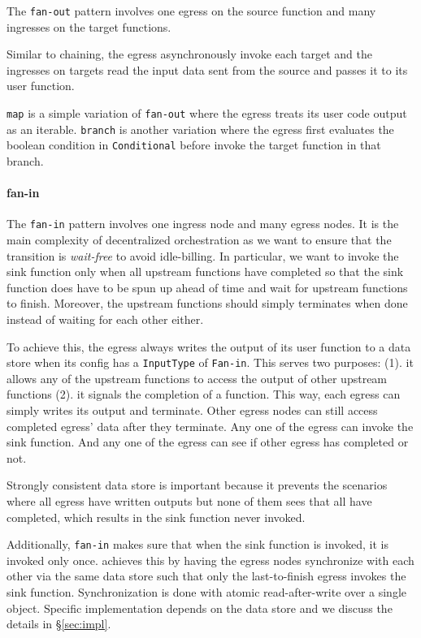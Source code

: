 The \texttt{fan-out} pattern involves one egress on the source function and
many ingresses on the target functions.

Similar to chaining, the egress asynchronously invoke each target and the
ingresses on targets read the input data sent from the source and passes it to
its user function.

\texttt{map} is a simple variation of \texttt{fan-out} where the egress treats
its user code output as an iterable. \texttt{branch} is another variation
where the egress first evaluates the boolean condition in \texttt{Conditional}
before invoke the target function in that branch.

\paragraph{fan-in}

The \texttt{fan-in} pattern involves one ingress node and many egress nodes.
It is the main complexity of decentralized orchestration as we want to ensure
that the transition is \emph{wait-free} to avoid idle-billing. In particular,
we want to invoke the sink function only when all upstream functions have
completed so that the sink function does have to be spun up ahead of time and
wait for upstream functions to finish. Moreover, the upstream functions should
simply terminates when done instead of waiting for each other either.

To achieve this, the \deorc{} egress always writes the output of its user
function to a data store when its \name{} config has a \texttt{InputType} of
\texttt{Fan-in}. This serves two purposes: (1). it allows any of the upstream
functions to access the output of other upstream functions (2). it signals the
completion of a function. This way, each egress can simply writes its output
and terminate. Other egress nodes can still access completed egress' data
after they terminate. Any one of the egress can invoke the sink function. And
any one of the egress can see if other egress has completed or not.

Strongly consistent data store is important because it prevents the
scenarios where all egress have written outputs but none of them sees that all
have completed, which results in the sink function never invoked.

Additionally, \texttt{fan-in} makes sure that when the sink function is
invoked, it is invoked only once. \name{} achieves this by having the egress
nodes synchronize with each other via the same data store such that only the
last-to-finish egress invokes the sink function. Synchronization is done with
atomic read-after-write over a single object. Specific implementation depends
on the data store and we discuss the details in \S\ref{sec:impl}.

